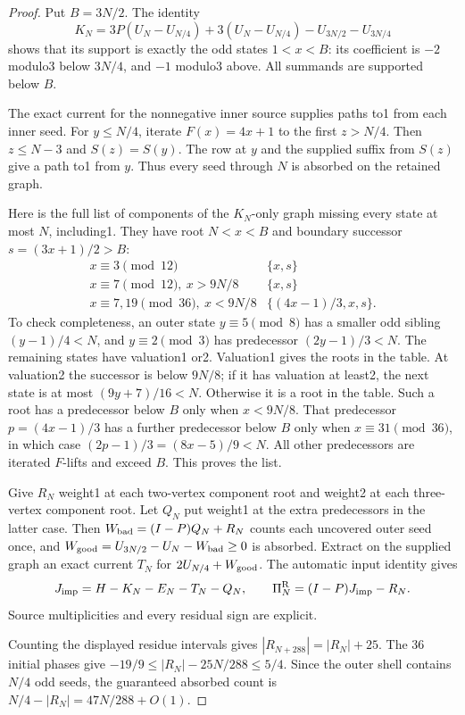 \documentclass[11pt]{article}
\newcommand{\PiR}{\Pi^{\mathrm R}}
\begin{document}
\begin{proof}
Put $B=3N/2$. The identity
\[
 K_N=3P(U_N-U_{N/4})+3(U_N-U_{N/4})-U_{3N/2}-U_{3N/4}
\]
shows that its support is exactly the odd states $1<x<B$:
its coefficient is $-2$ modulo3 below $3N/4$, and $-1$ modulo3 above.
All summands are supported below $B$.

The exact current for the nonnegative inner source supplies paths to1
from each inner seed. For $y\le N/4$, iterate $F(x)=4x+1$ to the first
$z>N/4$. Then $z\le N-3$ and $S(z)=S(y)$. The row at $y$ and the
supplied suffix from $S(z)$ give a path to1 from $y$. Thus every seed
through $N$ is absorbed on the retained graph.

Here is the full list of components of the $K_N$-only graph missing
every state at most $N$, including1. They have root $N<x<B$ and
boundary successor $s=(3x+1)/2>B$:
\[
 \begin{array}{c|c}
 x\equiv3\pmod{12}&\{x,s\}\\
 x\equiv7\pmod{12},\ x>9N/8&\{x,s\}\\
 x\equiv7,19\pmod{36},\ x<9N/8&
   \{(4x-1)/3,x,s\}.
 \end{array}
\]
To check completeness, an outer state $y\equiv5\pmod8$ has a smaller
odd sibling $(y-1)/4<N$, and $y\equiv2\pmod3$ has predecessor
$(2y-1)/3<N$. The remaining states have valuation1 or2.
Valuation1 gives the roots in the table. At valuation2 the successor
is below $9N/8$; if it has valuation at least2, the next state is at
most $(9y+7)/16<N$. Otherwise it is a root in the table.
Such a root has a predecessor below $B$ only when $x<9N/8$.
That predecessor $p=(4x-1)/3$ has a further predecessor below $B$
only when $x\equiv31\pmod{36}$, in which case
$(2p-1)/3=(8x-5)/9<N$. All other predecessors are iterated
$F$-lifts and exceed $B$. This proves the list.

Give $R_N$ weight1 at each two-vertex component root and weight2 at
each three-vertex component root. Let $Q_N$ put weight1 at the
extra predecessors in the latter case. Then
$W_{\rm bad}=(I-P)Q_N+R_N$ counts each uncovered outer seed once,
and $W_{\rm good}=U_{3N/2}-U_N-W_{\rm bad}\ge0$ is absorbed.
Extract on the supplied graph an exact current $T_N$ for
$2U_{N/4}+W_{\rm good}$. The automatic input identity gives
\[
 J_{\rm imp}=H-K_N-E_N-T_N-Q_N,\qquad
 \PiR_N=(I-P)J_{\rm imp}-R_N.
\]
Source multiplicities and every residual sign are explicit.

Counting the displayed residue intervals gives
$|R_{N+288}|=|R_N|+25$. The 36 initial phases give
$-19/9\le |R_N|-25N/288\le5/4$. Since the outer shell contains
$N/4$ odd seeds, the guaranteed absorbed count is
$N/4-|R_N|=47N/288+O(1)$.
\end{proof}
\end{document}
